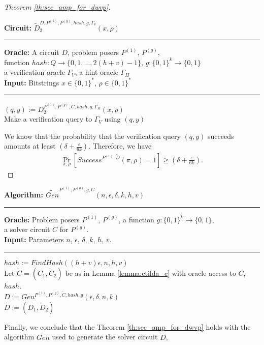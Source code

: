 \begin{proof}[Theorem \ref{th:sec_amp_for_dwvp}]
\begin{codeblock}
  \textbf{Circuit:} $\widetilde{D}_2^{D, P^{(1)}, P^{(g)}, hash, g, \Gamma_v}(x, \rho)$
  \medskip
  \hrule
  \medskip
  \textbf{Oracle:} A circuit $D$, problem posers $P^{(1)}$, $P^{(g)}$, \\
  \IndII function $hash: Q \rightarrow \{0,1, \dots, 2(h+v) - 1\}$, $g: \{0,1\}^{k} \rightarrow \{0,1\}$ \\
  \IndII a verification oracle $\Gamma_V$, a hint oracle $\Gamma_H$\\
  \textbf{Input:}  Bitstrings $x \in \{0,1\}^{*}$, $\rho \in \{0,1\}^{*}$
  \medskip\hrule\medskip
  $(q, y) := D_2^{P^{(1)}, P^{(g)}, \widetilde{C}, hash, g, \Gamma_H}(x, \rho)$ \\
  Make a verification query to $\Gamma_V$ using $(q,y)$
\end{codeblock}
We know that the probability that the verification query $(q,y)$ succeeds
amounts at least $(\delta + \frac{\epsilon}{6k})$.
Therefore, we have
\begin{align*}
    \underset{\pi, \rho}{\Pr}\left[Success^{P^{(1)},\widetilde{D}}(\pi, \rho) = 1\right] \geq (\delta + \frac{\varepsilon}{6k}).
\end{align*}
\end{proof}
%
\begin{codeblock}
  \textbf{Algorithm: $\widetilde{Gen}^{P^{(1)}, P^{(g)}, g, C}(n, \epsilon, \delta, k, h, v)$}
  \medskip \hrule \medskip
  \textbf{Oracle:} Problem posers $P^{(1)}$, $P^{(g)}$, a function $g: \{0,1\}^{k} \rightarrow \{0,1\}$, \\
  \IndII a solver circuit $C$ for $P^{(g)}$.  \\
  \textbf{Input:} Parameters $n$, $\epsilon$, $\delta$, $k$, $h$, $v$.
  \medskip\hrule\medskip
  $hash := FindHash((h+v)\epsilon, n, h, v)$ \\
  Let $\widetilde{C} = (C_1, \widetilde{C}_2)$ be as in Lemma \ref{lemma:ctilda_c} with oracle access to $C$, $hash$. \\
  $D := Gen^{P^{(1)}, P^{(g)}, \widetilde{C}, hash, g}(\epsilon, \delta, n, k)$ \\
  \Return $\widetilde{D} := (D_1, \widetilde{D}_2)$
\end{codeblock}
%
Finally, we conclude that the Theorem \ref{th:sec_amp_for_dwvp} holds with the algorithm $\widetilde{Gen}$ used to generate the solver circuit $\widetilde{D}$,

